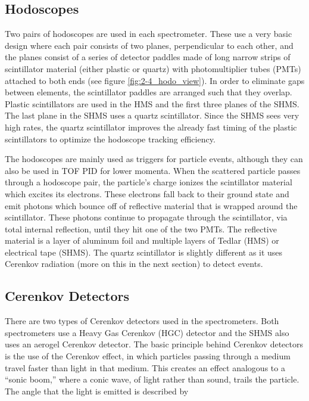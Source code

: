 \documentclass[
]{report}
\begin{document}
\hypertarget{hodoscopes}{%
\subsection{Hodoscopes}\label{hodoscopes}}

Two pairs of hodoscopes are used in each spectrometer. These use a very
basic design where each pair consists of two planes, perpendicular to
each other, and the planes consist of a series of detector paddles made
of long narrow strips of scintillator material (either plastic or
quartz) with photomultiplier tubes (PMTs) attached to both ends (see
figure \ref{fig:2-4_hodo_view}). In order to eliminate gaps between
elements, the scintillator paddles are arranged such that they overlap.
Plastic scintillators are used in the HMS and the first three planes of
the SHMS. The last plane in the SHMS uses a quartz scintillator. Since
the SHMS sees very high rates, the quartz scintillator improves the
already fast timing of the plastic scintillators to optimize the
hodoscope tracking efficiency.



The hodoscopes are mainly used as triggers for particle events, although
they can also be used in TOF PID for lower momenta. When the scattered
particle passes through a hodoscope pair, the particle's charge ionizes
the scintillator material which excites its electrons. These electrons
fall back to their ground state and emit photons which bounce off of
reflective material that is wrapped around the scintillator. These
photons continue to propagate through the scintillator, via total
internal reflection, until they hit one of the two PMTs. The reflective
material is a layer of aluminum foil and multiple layers of Tedlar (HMS)
or electrical tape (SHMS). The quartz scintillator is slightly different
as it uses Cerenkov radiation (more on this in the next section) to
detect events.

\hypertarget{cerenkov-detectors}{%
\subsection{Cerenkov Detectors}\label{cerenkov-detectors}}

There are two types of Cerenkov detectors used in the spectrometers.
Both spectrometers use a Heavy Gas Cerenkov (HGC) detector and the SHMS
also uses an aerogel Cerenkov detector. The basic principle behind
Cerenkov detectors is the use of the Cerenkov effect, in which particles
passing through a medium travel faster than light in that medium. This
creates an effect analogous to a ``sonic boom,'' where a conic wave, of
light rather than sound, trails the particle. The angle that the light
is emitted is described by
\end{document}
